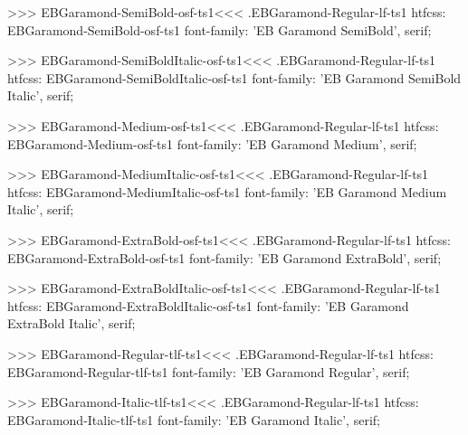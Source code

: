 {{{{{{{>>>
\<EBGaramond-SemiBold-osf-ts1\><<<
.EBGaramond-Regular-lf-ts1
htfcss:  EBGaramond-SemiBold-osf-ts1  font-family: 'EB Garamond SemiBold', serif;

>>>
\<EBGaramond-SemiBoldItalic-osf-ts1\><<<
.EBGaramond-Regular-lf-ts1
htfcss:  EBGaramond-SemiBoldItalic-osf-ts1  font-family: 'EB Garamond SemiBold Italic', serif;

>>>
\<EBGaramond-Medium-osf-ts1\><<<
.EBGaramond-Regular-lf-ts1
htfcss:  EBGaramond-Medium-osf-ts1  font-family: 'EB Garamond Medium', serif;

>>>
\<EBGaramond-MediumItalic-osf-ts1\><<<
.EBGaramond-Regular-lf-ts1
htfcss:  EBGaramond-MediumItalic-osf-ts1  font-family: 'EB Garamond Medium Italic', serif;

>>>
\<EBGaramond-ExtraBold-osf-ts1\><<<
.EBGaramond-Regular-lf-ts1
htfcss:  EBGaramond-ExtraBold-osf-ts1  font-family: 'EB Garamond ExtraBold', serif;

>>>
\<EBGaramond-ExtraBoldItalic-osf-ts1\><<<
.EBGaramond-Regular-lf-ts1
htfcss:  EBGaramond-ExtraBoldItalic-osf-ts1  font-family: 'EB Garamond ExtraBold Italic', serif;

>>>
\<EBGaramond-Regular-tlf-ts1\><<<
.EBGaramond-Regular-lf-ts1
htfcss:  EBGaramond-Regular-tlf-ts1  font-family: 'EB Garamond Regular', serif;

>>>
\<EBGaramond-Italic-tlf-ts1\><<<
.EBGaramond-Regular-lf-ts1
htfcss:  EBGaramond-Italic-tlf-ts1  font-family: 'EB Garamond Italic', serif;

}}}}}}}
